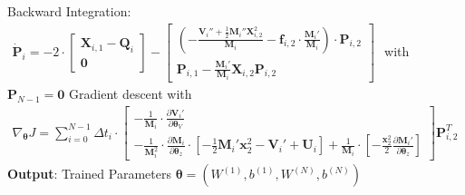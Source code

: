 \documentclass[a4paper, 12pt]{scrartcl}
\begin{document}
\begin{algorithm*}
\begin{algorithmic}[1]
            \State Backward Integration:
            $\begin{aligned}
                \bm{\dot{P}}_{i}
                =
                -2 
                \cdot 
                \begin{bmatrix}
                    \bm{X}_{i,1} - \bm{Q}_{i} \\
                    \bm{0}
                \end{bmatrix}
                -
                \begin{bmatrix}
                    \left(
                        -
                        \frac{
                            \bm{V}_{i}'' + \frac{1}{2} \bm{M}_{i}'' \bm{X}_{i,2}^2
                        }{\bm{M}_i}
                        - 
                        \bm{f}_{i,2} 
                        \cdot 
                        \frac{\bm{M}_{i}'}{\bm{M}_i}
                    \right)
                    \cdot 
                    \bm{P}_{i,2}
                    \\
                    \bm{P}_{i,1}
                    - 
                    \frac{\bm{M}_{i}'}{\bm{M}_i}
                    \bm{X}_{i,2}
                    \bm{P}_{i,2}
                \end{bmatrix}
            \end{aligned}$
            with $\bm{P}_{N-1} = \bm{0}$
            \State Gradient descent with 
            $\begin{aligned}
                \nabla_{\bm{\theta}} J 
                = 
                \sum_{i=0}^{N-1} \Delta t_i \cdot 
                \begin{bmatrix}
                    - \frac{1}{\bm{M}_{i}} \cdot 
                    \frac{\partial \bm{V}_{i}'}{\partial \bm{\theta}_V}
                    \\
                    -\frac{1}{\bm{M}_{i}^2} \cdot 
                    \frac{\partial \bm{M}_{i}}{\partial \bm{\theta}_z}
                    \cdot 
                    \left[
                        -\frac{1}{2} \bm{M}_{i}' \bm{x}_2^2 - \bm{V}_{i}' + \bm{U}_i
                    \right]
                    +
                    \frac{1}{\bm{M}_{i}}
                    \cdot 
                    \left[
                        -\frac{\bm{x}_2^2}{2} 
                        \frac{\partial \bm{M}_{i}'}{\partial \bm{\theta}_z}
                    \right]
                \end{bmatrix}
                \bm{P}_{i,2}^T
            \end{aligned}$
        \EndFor
        \State \textbf{Output}: Trained Parameters $\bm{\theta} = (W^{(1)}, b^{(1)}, W^{(N)}, b^{(N)})$
    \end{algorithmic}
\end{algorithm*}
\end{document}
